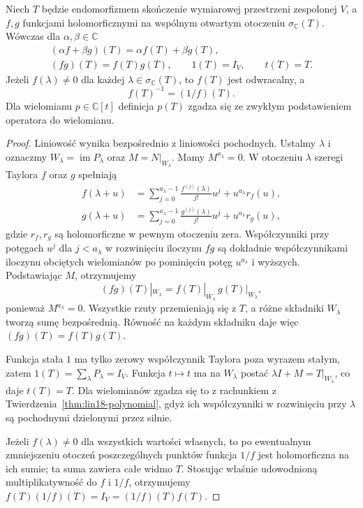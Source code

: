 \begin{twierdzenie}
\label{thm:lin18-analytic-calculus}
Niech \(T\) będzie endomorfizmem
skończenie wymiarowej przestrzeni
zespolonej \(V\),
a \(f,g\) funkcjami holomorficznymi
na wspólnym otwartym otoczeniu
\(\sigma_{\mathbb C}(T)\).
Wówczas dla \(\alpha,\beta\in\mathbb C\)
\[
 \begin{gathered}
 (\alpha f+\beta g)(T)
    =\alpha f(T)+\beta g(T),\\
 (fg)(T)=f(T)g(T),\qquad
 1(T)=I_V,\qquad
 t(T)=T.
 \end{gathered}
\]
Jeżeli \(f(\lambda)\ne0\)
dla każdej \(\lambda\in\sigma_{\mathbb C}(T)\),
to \(f(T)\) jest odwracalny, a
\[
 f(T)^{-1}=(1/f)(T).
\]
Dla wielomianu \(p\in\mathbb C[t]\)
definicja \(p(T)\) zgadza się
ze zwykłym podstawieniem operatora
do wielomianu.
\end{twierdzenie}
\begin{proof}
Liniowość wynika bezpośrednio
z liniowości pochodnych.
Ustalmy \(\lambda\) i oznaczmy
\(W_\lambda=\operatorname{im}P_\lambda\)
oraz \(M=N|_{W_\lambda}\).
Mamy \(M^{a_\lambda}=0\).
W otoczeniu \(\lambda\)
szeregi Taylora \(f\) oraz \(g\)
spełniają
\[
 \begin{aligned}
 f(\lambda+u)
 &=\sum_{j=0}^{a_\lambda-1}
   \frac{f^{(j)}(\lambda)}{j!}u^j
   +u^{a_\lambda}r_f(u),\\
 g(\lambda+u)
 &=\sum_{j=0}^{a_\lambda-1}
   \frac{g^{(j)}(\lambda)}{j!}u^j
   +u^{a_\lambda}r_g(u),
 \end{aligned}
\]
gdzie \(r_f,r_g\) są holomorficzne
w pewnym otoczeniu zera.
Współczynniki przy potęgach \(u^j\)
dla \(j<a_\lambda\)
w rozwinięciu iloczynu \(fg\)
są dokładnie współczynnikami iloczynu
obciętych wielomianów po pominięciu
potęg \(u^{a_\lambda}\) i wyższych.
Podstawiając \(M\), otrzymujemy
\[
 (fg)(T)|_{W_\lambda}
 =f(T)|_{W_\lambda}\,g(T)|_{W_\lambda},
\]
ponieważ \(M^{a_\lambda}=0\).
Wszystkie rzuty przemieniają się z \(T\),
a różne składniki \(W_\lambda\)
tworzą sumę bezpośrednią.
Równość na każdym składniku
daje więc \((fg)(T)=f(T)g(T)\).

Funkcja stała \(1\) ma tylko
zerowy współczynnik Taylora poza
wyrazem stałym, zatem \(1(T)=\sum_\lambda
P_\lambda=I_V\).
Funkcja \(t\mapsto t\) ma
na \(W_\lambda\) postać
\(\lambda I+M=T|_{W_\lambda}\),
co daje \(t(T)=T\).
Dla wielomianów zgadza się to
z rachunkiem z
Twierdzenia~\ref{thm:lin18-polynomial},
gdyż ich współczynniki
w rozwinięciu przy \(\lambda\)
są pochodnymi dzielonymi przez silnie.

Jeżeli \(f(\lambda)\ne0\)
dla wszystkich wartości własnych,
to po ewentualnym zmniejszeniu
otoczeń poszczególnych punktów
funkcja \(1/f\) jest holomorficzna
na ich sumie; ta suma zawiera
całe widmo \(T\).
Stosując właśnie udowodnioną
multiplikatywność do \(f\) i \(1/f\),
otrzymujemy
\(f(T)(1/f)(T)=I_V=(1/f)(T)f(T)\).
\end{proof}

